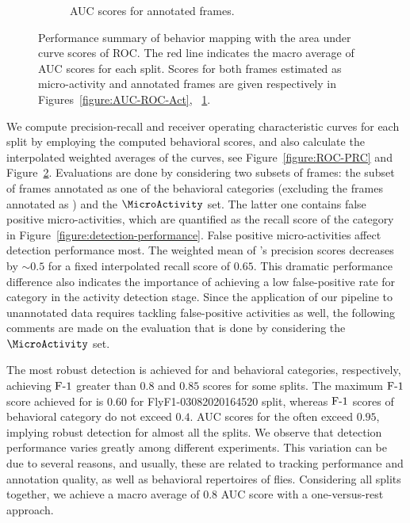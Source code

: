 \begin{figure}[htb!]
\begin{subfigure}[b]{0.5\linewidth}
		\caption{AUC scores for annotated frames. \label{figure:AUC-ROC-Ann}}
	\end{subfigure}%
	\caption[Performance summary of behavior mapping with the area under curve scores of ROC.]
	{Performance summary of behavior mapping with the area under curve scores of ROC.
		The red line indicates the macro average of AUC scores for each split.
		Scores for both frames estimated as micro-activity and annotated frames are given respectively in Figures~\ref{figure:AUC-ROC-Act}, ~\ref{figure:AUC-ROC-Ann}.
		\label{figure:AUC}}
\end{figure}

We compute precision-recall and receiver operating characteristic curves for each split by employing the computed behavioral scores, and also calculate the interpolated weighted averages of the curves, see Figure~\ref{figure:ROC-PRC} and Figure~\ref{figure:AUC}.
Evaluations are done by considering two subsets of frames: the subset of frames annotated as one of the behavioral categories (excluding the frames annotated as \QuiescentOther) and the $\MicroActivity$ set.
The latter one contains false positive micro-activities, which are quantified as the recall score of the \QuiescentOther category in Figure~\ref{figure:detection-performance}.
False positive micro-activities affect \HaltereSwitch detection performance most. The weighted mean of \HaltereSwitch's precision scores decreases by ${\sim}0.5$ for a fixed interpolated recall score of $0.65$.
This dramatic performance difference also indicates the importance of achieving a low false-positive rate for \QuiescentOther category in the activity detection stage.
Since the application of our pipeline to unannotated data requires tackling false-positive activities as well, the following comments are made on the evaluation that is done by considering the $\MicroActivity$ set.

The most robust detection is achieved for \ProboscisPumping and \PosturalAdjustment behavioral categories, respectively, achieving $\textnormal{F-}1$ greater than $0.8$ and $0.85$ scores for some splits.
The maximum $\textnormal{F-}1$ score achieved for \Grooming is $0.60$ for FlyF1-03082020164520 split, whereas $\textnormal{F-}1$ scores of \HaltereSwitch behavioral category do not exceed $0.4$.
AUC scores for the \ProboscisPumping often exceed $0.95$, implying robust detection for almost all the splits.
We observe that detection performance varies greatly among different experiments. This variation can be due to several reasons, and usually, these are related to tracking performance and annotation quality, as well as behavioral repertoires of flies.
Considering all splits together, we achieve a macro average of $0.8$ AUC score with a one-versus-rest approach.


